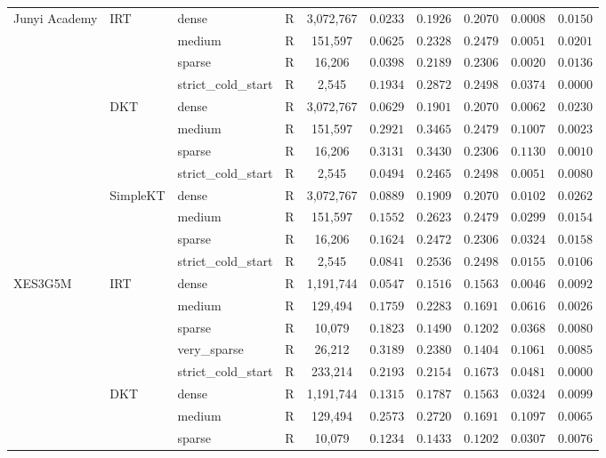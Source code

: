 \begin{table}[htbp]
{\begin{tabular}{lllrcccccc}
\midrule
Junyi Academy & IRT & dense & R & 3,072,767 & $0.0233$ & $0.1926$ & $0.2070$ & $0.0008$ & $0.0150$ \\
 &  & medium & R & 151,597 & $0.0625$ & $0.2328$ & $0.2479$ & $0.0051$ & $0.0201$ \\
 &  & sparse & R & 16,206 & $0.0398$ & $0.2189$ & $0.2306$ & $0.0020$ & $0.0136$ \\
 &  & strict\_cold\_start & R & 2,545 & $0.1934$ & $0.2872$ & $0.2498$ & $0.0374$ & $0.0000$ \\
 & DKT & dense & R & 3,072,767 & $0.0629$ & $0.1901$ & $0.2070$ & $0.0062$ & $0.0230$ \\
 &  & medium & R & 151,597 & $0.2921$ & $0.3465$ & $0.2479$ & $0.1007$ & $0.0023$ \\
 &  & sparse & R & 16,206 & $0.3131$ & $0.3430$ & $0.2306$ & $0.1130$ & $0.0010$ \\
 &  & strict\_cold\_start & R & 2,545 & $0.0494$ & $0.2465$ & $0.2498$ & $0.0051$ & $0.0080$ \\
 & SimpleKT & dense & R & 3,072,767 & $0.0889$ & $0.1909$ & $0.2070$ & $0.0102$ & $0.0262$ \\
 &  & medium & R & 151,597 & $0.1552$ & $0.2623$ & $0.2479$ & $0.0299$ & $0.0154$ \\
 &  & sparse & R & 16,206 & $0.1624$ & $0.2472$ & $0.2306$ & $0.0324$ & $0.0158$ \\
 &  & strict\_cold\_start & R & 2,545 & $0.0841$ & $0.2536$ & $0.2498$ & $0.0155$ & $0.0106$ \\
\midrule
XES3G5M & IRT & dense & R & 1,191,744 & $0.0547$ & $0.1516$ & $0.1563$ & $0.0046$ & $0.0092$ \\
 &  & medium & R & 129,494 & $0.1759$ & $0.2283$ & $0.1691$ & $0.0616$ & $0.0026$ \\
 &  & sparse & R & 10,079 & $0.1823$ & $0.1490$ & $0.1202$ & $0.0368$ & $0.0080$ \\
 &  & very\_sparse & R & 26,212 & $0.3189$ & $0.2380$ & $0.1404$ & $0.1061$ & $0.0085$ \\
 &  & strict\_cold\_start & R & 233,214 & $0.2193$ & $0.2154$ & $0.1673$ & $0.0481$ & $0.0000$ \\
 & DKT & dense & R & 1,191,744 & $0.1315$ & $0.1787$ & $0.1563$ & $0.0324$ & $0.0099$ \\
 &  & medium & R & 129,494 & $0.2573$ & $0.2720$ & $0.1691$ & $0.1097$ & $0.0065$ \\
 &  & sparse & R & 10,079 & $0.1234$ & $0.1433$ & $0.1202$ & $0.0307$ & $0.0076$ \\

\end{tabular}}
\end{table}
